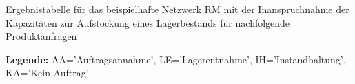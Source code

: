 \begin{table}
\begin{footnotesize}
    \caption{Ergebnistabelle für das beispielhafte Netzwerk RM mit der Inanspruchnahme der Kapazitäten zur Aufstockung eines Lagerbestands für nachfolgende Produktanfragen} \label{Tab8}
    \vspace*{3mm}
    \begin{center}
      \end{center}
    \begin{center}
          {\footnotesize \textbf{Legende:} AA='Auftragsannahme', LE='Lagerentnahme', IH='Instandhaltung', KA='Kein Auftrag'} 
      \end{center}
\end{footnotesize}
\end{table}

